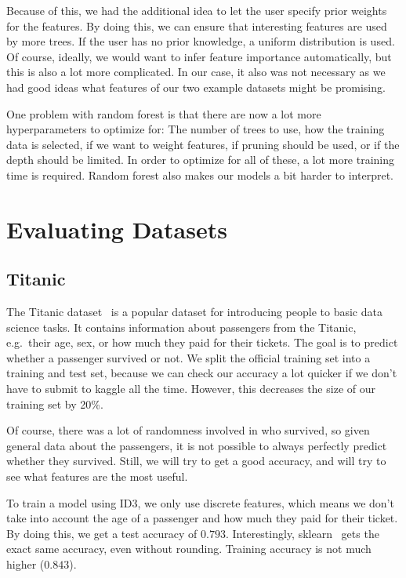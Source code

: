 \documentclass[a4paper]{article}
\begin{document}
Because of this, we had the additional idea to let the user specify prior weights for the features. By doing this, we can ensure that interesting features are used by more trees. If the user has no prior knowledge, a uniform distribution is used. Of course, ideally, we would want to infer feature importance automatically, but this is also a lot more complicated. In our case, it also was not necessary as we had good ideas what features of our two example datasets might be promising.

One problem with random forest is that there are now a lot more hyperparameters to optimize for: The number of trees to use, how the training data is selected, if we want to weight features, if pruning should be used, or if the depth should be limited. In order to optimize for all of these, a lot more training time is required. Random forest also makes our models a bit harder to interpret.

\section{Evaluating Datasets}

\subsection{Titanic}

The Titanic dataset~\cite{titanic} is a popular dataset for introducing people to basic data science tasks. It contains information about passengers from the Titanic, e.g.\  their age, sex, or how much they paid for their tickets. The goal is to predict whether a passenger survived or not. We split the official training set into a training and test set, because we can check our accuracy a lot quicker if we don't have to submit to kaggle all the time. However, this decreases the size of our training set by 20\%.

Of course, there was a lot of randomness involved in who survived, so given general data about the passengers, it is not possible to always perfectly predict whether they survived. Still, we will try to get a good accuracy, and will try to see what features are the most useful.

To train a model using ID3, we only use discrete features, which means we don't take into account the age of a passenger and how much they paid for their ticket. By doing this, we get a test accuracy of $0.793$. Interestingly, sklearn~\cite{scikit-learn} gets the exact same accuracy, even without rounding. Training accuracy is not much higher ($0.843$).
\end{document}
